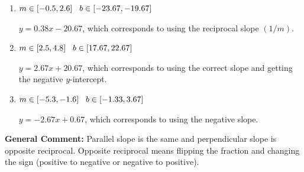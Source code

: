 \documentclass{extbook}[14pt]
\begin{document}
\begin{enumerate}
{\begin{enumerate}[label=\Alph*.]
* $y = 2.67x - 20.67$, which is the correct option.
\item \( m \in [-0.5, 2.6] \hspace*{3mm} b \in [-23.67, -19.67] \)

 $y = 0.38x - 20.67$, which corresponds to using the reciprocal slope $(1/m)$.
\item \( m \in [2.5, 4.8] \hspace*{3mm} b \in [17.67, 22.67] \)

 $y = 2.67x + 20.67$, which corresponds to using the correct slope and getting the negative $y$-intercept.
\item \( m \in [-5.3, -1.6] \hspace*{3mm} b \in [-1.33, 3.67] \)

 $y = -2.67x + 0.67$, which corresponds to using the negative slope.
\end{enumerate}

\textbf{General Comment:} Parallel slope is the same and perpendicular slope is opposite reciprocal. Opposite reciprocal means flipping the fraction and changing the sign (positive to negative or negative to positive).
}
\end{enumerate}
\end{document}
